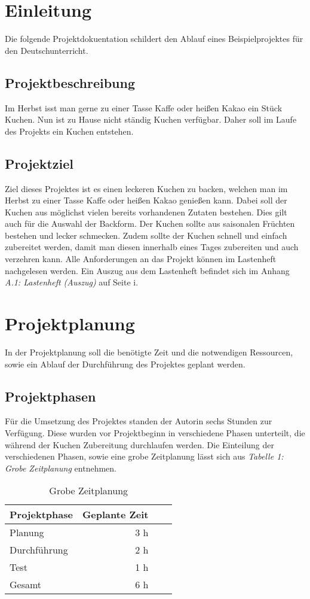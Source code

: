 \section{Einleitung}
Die folgende Projektdokuentation schildert den Ablauf eines Beispielprojektes für den Deutschunterricht.
\subsection{Projektbeschreibung}
Im Herbst isst man gerne zu einer Tasse Kaffe oder heißen Kakao ein Stück Kuchen. Nun ist zu Hause nicht ständig Kuchen verfügbar. Daher soll im Laufe des Projekts
ein Kuchen entstehen.
\subsection{Projektziel}
Ziel dieses Projektes ist es einen leckeren Kuchen zu backen, welchen man im Herbst zu einer Tasse Kaffe oder heißen Kakao genießen kann.
Dabei soll der Kuchen aus möglichst vielen bereits vorhandenen Zutaten bestehen. Dies gilt auch für die Auswahl der Backform.
Der Kuchen sollte aus saisonalen Früchten bestehen und lecker schmecken. Zudem sollte der Kuchen schnell und einfach zubereitet werden,
damit man diesen innerhalb eines Tages zubereiten und auch verzehren kann. Alle Anforderungen an das Projekt können im Lastenheft nachgelesen werden.
Ein Auszug aus dem Lastenheft befindet sich im Anhang \emph{A.1: Lastenheft (Auszug)} auf Seite i.

\section{Projektplanung}
In der Projektplanung soll die benötigte Zeit und die notwendigen Ressourcen, sowie ein Ablauf der Durchführung 
des Projektes geplant werden.
\subsection{Projektphasen}
Für die Umsetzung des Projektes standen der Autorin sechs Stunden zur Verfügung. Diese wurden vor Projektbeginn in verschiedene Phasen
unterteilt, die während der Kuchen Zubereitung durchlaufen werden. Die Einteilung der verschiedenen Phasen, sowie eine grobe Zeitplanung lässt sich aus \emph{Tabelle 1: Grobe Zeitplanung} entnehmen.
\begin{table}[h]
    \centering
    \begin{tabular}{l*{2}{r}r|}
        \hline
        Projektphase    & Geplante Zeit \\
        \hline
        Planung & 3 h\\
        Durchführung    & 2 h  \\
        Test      & 1 h   \\
        \hline
        Gesamt & 6 h \\
        \hline
        \end{tabular}
        \caption{Grobe Zeitplanung}
\end{table}
